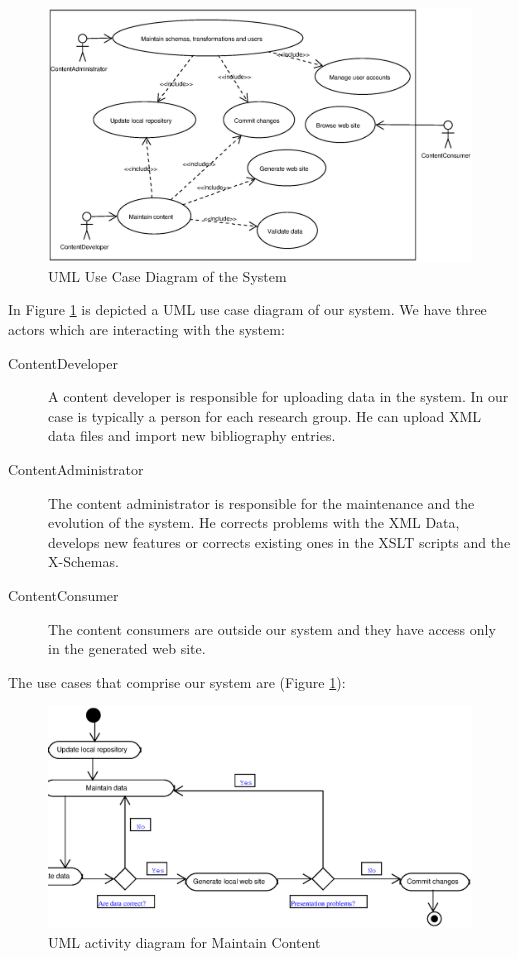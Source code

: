 \documentclass[10pt]{article}
\begin{document}
\begin{figure}[h!]
\includegraphics[scale=0.5]{use-case-diagram}
\caption{UML Use Case Diagram of the System}
\label{fig:use-case-diagram}
\end{figure}

In Figure \ref{fig:use-case-diagram} is depicted a UML use case diagram of our system. 
We have three actors which are interacting with the system:

\begin{description}
\item[ContentDeveloper] A content developer is responsible for uploading data in the system. 
In our case is typically a person for each research group. He can upload XML data files and import new bibliography entries.

\item[ContentAdministrator] The content administrator is responsible for the maintenance 
and the evolution of the system. He corrects problems with the XML Data, develops 
new features or corrects existing ones in the XSLT scripts and the X-Schemas.

\item[ContentConsumer] The content consumers are outside our system
and they have access only in the generated web site.
\end{description}

The use cases that comprise our system are (Figure \ref{fig:use-case-diagram}):

\begin{figure}
\includegraphics[scale=0.5]{maintain-content-activity}
\caption{UML activity diagram for Maintain Content}
\label{fig:maintain-content-diagram}
\end{figure}
\end{document}
